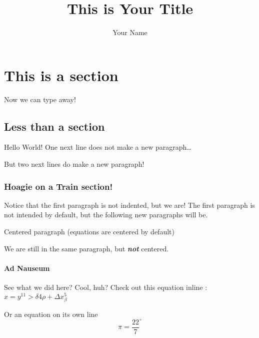 \documentclass[12pt]{article} %
\date{} %
\title{This is Your Title} %
\author{Your Name}
\begin{document}
\maketitle
\section{This is a section}
Now we can type away!

\subsection{Less than a section}
Hello World!
One next line does not make a new paragraph…

But two next lines do make a new paragraph!

\subsubsection{Hoagie on a Train section!}
Notice that the first paragraph is not indented, but we are!  The first paragraph is not intended by default, but the following new paragraphs will be.

\begin{center}
Centered paragraph  (equations are centered by default)
\end{center}
We are still in the same paragraph, but \textit{\textbf{not}} centered.

\paragraph{Ad Nauseum}
See what we did here?  Cool, huh?  Check out this equation inline : $x=y^{11}>\delta4\rho+\Delta x^5_\beta$  

Or an equation on its own line
\begin{equation}
\pi=\frac{22}{7}^{\circ}
\end{equation}	
\end{document}
